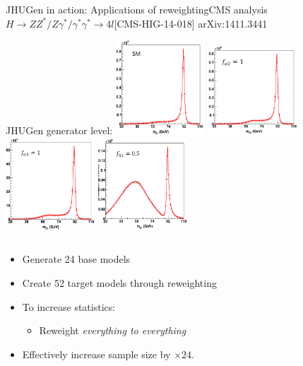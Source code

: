 \documentclass[usenames,dvipsnames,svgnames,table]{beamer}
\begin{document}
\begin{frame}{JHUGen in action: Applications of reweighting}{CMS analysis $H \to ZZ^*/Z\gamma^*/\gamma^*\gamma^* \to 4l$\hfill [CMS-HIG-14-018] arXiv:1411.3441}

JHUGen generator level:
\includegraphics[width=0.25\textwidth]{HVV/SM}
\includegraphics[width=0.25\textwidth]{HVV/fa2}
\includegraphics[width=0.25\textwidth]{HVV/fa3}
\includegraphics[width=0.25\textwidth]{HVV/flambda1}
\begin{columns}
\begin{column}{0.6\textwidth}
\footnotesize
\begin{itemize}
\item Generate 24 base models
\item Create 52 target models through reweighting
\item To increase statistics:
\begin{itemize}
\item Reweight \emph{everything to everything}
\end{itemize}
\item Effectively increase sample size by $\times 24$.

\end{itemize}
\end{column}
\end{columns}
\end{frame}
\end{document}
